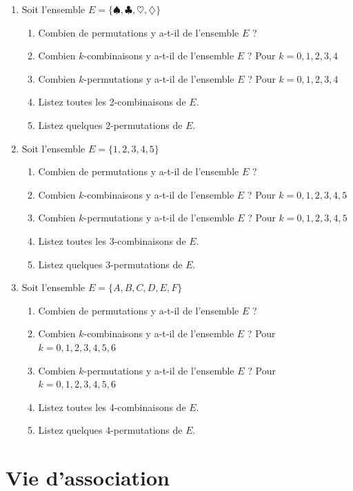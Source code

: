 \documentclass[a4paper,11pt]{article}
\begin{document}
\begin{enumerate}
\item Soit l'ensemble $E = \{\spadesuit, \clubsuit, \heartsuit, \diamondsuit\}$
\begin{enumerate}
\item Combien de permutations y a-t-il de l'ensemble $E$ ?
\item Combien $k$-combinaisons y a-t-il de l'ensemble $E$ ? Pour $k = 0, 1, 2, 3, 4$
\item Combien $k$-permutations y a-t-il de l'ensemble $E$ ? Pour $k = 0, 1, 2, 3, 4$
\item Listez toutes les 2-combinaisons de $E$.
\item Listez quelques 2-permutations de $E$.
\end{enumerate}

\item Soit l'ensemble $E = \{1, 2, 3, 4, 5\}$
\begin{enumerate}
\item Combien de permutations y a-t-il de l'ensemble $E$ ?
\item Combien $k$-combinaisons y a-t-il de l'ensemble $E$ ? Pour $k = 0, 1, 2, 3, 4, 5$
\item Combien $k$-permutations y a-t-il de l'ensemble $E$ ? Pour $k = 0, 1, 2, 3, 4, 5$
\item Listez toutes les 3-combinaisons de $E$.
\item Listez quelques 3-permutations de $E$.
\end{enumerate}

\item Soit l'ensemble $E = \{A, B, C, D, E, F\}$
\begin{enumerate}
\item Combien de permutations y a-t-il de l'ensemble $E$ ?
\item Combien $k$-combinaisons y a-t-il de l'ensemble $E$ ? Pour $k = 0, 1, 2, 3, 4, 5, 6$
\item Combien $k$-permutations y a-t-il de l'ensemble $E$ ? Pour $k = 0, 1, 2, 3, 4, 5, 6$
\item Listez toutes les 4-combinaisons de $E$.
\item Listez quelques 4-permutations de $E$.
\end{enumerate}
\end{enumerate}

\section{Vie d'association}
\end{document}
